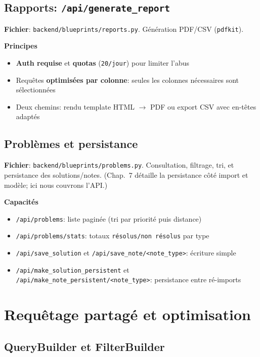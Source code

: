 \subsection{Rapports: \texttt{/api/generate\_report}}

\textbf{Fichier}: \texttt{backend/blueprints/reports.py}. Génération PDF/CSV (\texttt{pdfkit}).

\textbf{Principes}
\begin{itemize}
  \item \textbf{Auth requise} et \textbf{quotas} (\texttt{20/jour}) pour limiter l'abus
  \item Requêtes \textbf{optimisées par colonne}: seules les colonnes nécessaires sont sélectionnées
  \item Deux chemins: rendu template HTML \(\rightarrow\) PDF ou export CSV avec en-têtes adaptés
\end{itemize}

\subsection{Problèmes et persistance}

\textbf{Fichier}: \texttt{backend/blueprints/problems.py}. Consultation, filtrage, tri, et persistance des solutions/notes. (Chap.~7 détaille la persistance côté import et modèle; ici nous couvrons l'API.)

\textbf{Capacités}
\begin{itemize}
  \item \texttt{/api/problems}: liste paginée (tri par priorité puis distance)
  \item \texttt{/api/problems/stats}: totaux \texttt{résolus/non résolus} par type
  \item \texttt{/api/save\_solution} et \texttt{/api/save\_note/<note\_type>}: écriture simple
  \item \texttt{/api/make\_solution\_persistent} et \texttt{/api/make\_note\_persistent/<note\_type>}: persistance entre ré-imports
\end{itemize}

\section{Requêtage partagé et optimisation}

\subsection*{QueryBuilder et FilterBuilder}

